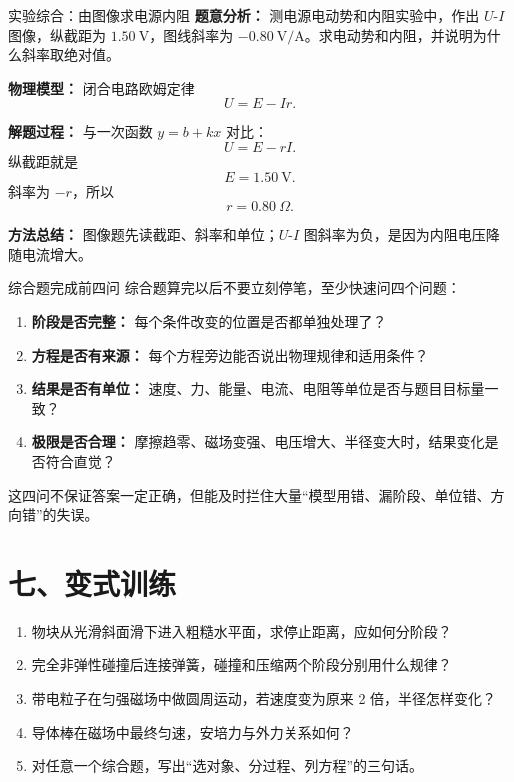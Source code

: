 \begin{examplebox}{实验综合：由图像求电源内阻}
\textbf{题意分析：} 测电源电动势和内阻实验中，作出 $U$-$I$ 图像，纵截距为 $1.50\ \mathrm{V}$，图线斜率为 $-0.80\ \mathrm{V/A}$。求电动势和内阻，并说明为什么斜率取绝对值。

\textbf{物理模型：} 闭合电路欧姆定律
\[
U=E-Ir.
\]

\begin{center}

\end{center}

\textbf{解题过程：}
与一次函数 $y=b+kx$ 对比：
\[
U=E-rI.
\]
纵截距就是
\[
E=1.50\ \mathrm{V}.
\]
斜率为 $-r$，所以
\[
r=0.80\ \Omega.
\]

\textbf{方法总结：} 图像题先读截距、斜率和单位；$U$-$I$ 图斜率为负，是因为内阻电压降随电流增大。
\end{examplebox}

\begin{learningbox}{综合题完成前四问}
综合题算完以后不要立刻停笔，至少快速问四个问题：
\begin{enumerate}
  \item \textbf{阶段是否完整：} 每个条件改变的位置是否都单独处理了？
  \item \textbf{方程是否有来源：} 每个方程旁边能否说出物理规律和适用条件？
  \item \textbf{结果是否有单位：} 速度、力、能量、电流、电阻等单位是否与题目目标量一致？
  \item \textbf{极限是否合理：} 摩擦趋零、磁场变强、电压增大、半径变大时，结果变化是否符合直觉？
\end{enumerate}
这四问不保证答案一定正确，但能及时拦住大量“模型用错、漏阶段、单位错、方向错”的失误。
\end{learningbox}

\section*{七、变式训练}

\begin{enumerate}
  \item 物块从光滑斜面滑下进入粗糙水平面，求停止距离，应如何分阶段？
  \begin{center}
  
  \end{center}
  \item 完全非弹性碰撞后连接弹簧，碰撞和压缩两个阶段分别用什么规律？
  \begin{center}
  
  \end{center}
  \item 带电粒子在匀强磁场中做圆周运动，若速度变为原来 2 倍，半径怎样变化？
  \item 导体棒在磁场中最终匀速，安培力与外力关系如何？
  \begin{center}
  
  \end{center}
  \item 对任意一个综合题，写出“选对象、分过程、列方程”的三句话。
\end{enumerate}

